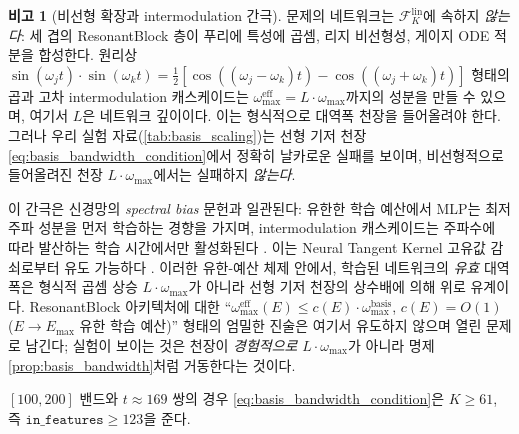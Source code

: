 \documentclass[11pt, a4paper]{article}
\theoremstyle{definition}
\newtheorem{remark}{비고}[section]
\theoremstyle{plain}
\begin{document}
\begin{remark}[비선형 확장과 intermodulation 간극]
\label{rem:intermodulation_gap}
문제의 네트워크는 $\mathcal{F}_K^{\mathrm{lin}}$에 속하지 \emph{않는다}: 세 겹의 ResonantBlock 층이 푸리에 특성에 곱셈, 리지 비선형성, 게이지 ODE 적분을 합성한다. 원리상 $\sin(\omega_j t)\cdot\sin(\omega_k t)=\tfrac{1}{2}[\cos((\omega_j-\omega_k)t)-\cos((\omega_j+\omega_k)t)]$ 형태의 곱과 고차 intermodulation 캐스케이드는 $\omega^{\mathrm{eff}}_{\max}=L\cdot\omega_{\max}$까지의 성분을 만들 수 있으며, 여기서 $L$은 네트워크 깊이이다. 이는 형식적으로 대역폭 천장을 들어올려야 한다. 그러나 우리 실험 자료(\cref{tab:basis_scaling})는 선형 기저 천장 \eqref{eq:basis_bandwidth_condition}에서 정확히 날카로운 실패를 보이며, 비선형적으로 들어올려진 천장 $L\cdot\omega_{\max}$에서는 실패하지 \emph{않는다}.

이 간극은 신경망의 \emph{spectral bias} 문헌과 일관된다: 유한한 학습 예산에서 MLP는 최저주파 성분을 먼저 학습하는 경향을 가지며, intermodulation 캐스케이드는 주파수에 따라 발산하는 학습 시간에서만 활성화된다 \cite{Rahaman2019SpectralBias,BasriGeifman2020FrequencyBias}. 이는 Neural Tangent Kernel 고유값 감쇠로부터 유도 가능하다 \cite{Jacot2018NTK}. 이러한 유한-예산 체제 안에서, 학습된 네트워크의 \emph{유효} 대역폭은 형식적 곱셈 상승 $L\cdot\omega_{\max}$가 아니라 선형 기저 천장의 상수배에 의해 위로 유계이다. ResonantBlock 아키텍처에 대한 ``$\omega^{\mathrm{eff}}_{\max}(E)\leq c(E)\cdot\omega^{\mathrm{basis}}_{\max}$, $c(E)=O(1)$ ($E\to E_{\max}$ 유한 학습 예산)'' 형태의 엄밀한 진술은 여기서 유도하지 않으며 열린 문제로 남긴다; 실험이 보이는 것은 천장이 \emph{경험적으로} $L\cdot\omega_{\max}$가 아니라 명제 \ref{prop:basis_bandwidth}처럼 거동한다는 것이다.
\end{remark}

$[100,200]$ 밴드와 $t\approx 169$ 쌍의 경우 \eqref{eq:basis_bandwidth_condition}은 $K\geq 61$, 즉 $\texttt{in\_features}\geq 123$을 준다.
\end{document}
